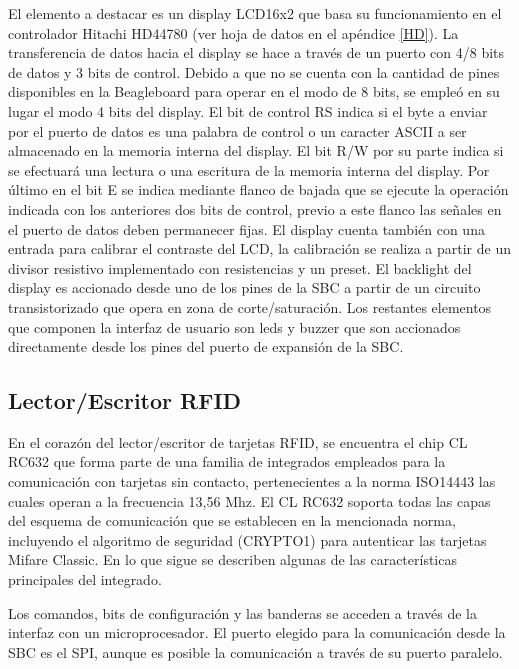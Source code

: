 \newpage
{}

El elemento a destacar es un display LCD16x2 que basa su funcionamiento en el controlador Hitachi HD44780 \cite{dpy} (ver hoja de datos en el apéndice \ref{HD}). La transferencia de datos hacia el display se hace a través de un puerto con 4/8 bits de datos y 3 bits de control. Debido a que no se cuenta con la cantidad de pines disponibles en la Beagleboard para operar en el modo de 8 bits, se empleó en su lugar el modo 4 bits del display. El bit de control RS indica si el byte a enviar por el puerto de datos es una palabra de control o un caracter ASCII a ser almacenado en la memoria interna del display. El bit R/W por su parte indica si se efectuará una lectura o una escritura de la memoria interna del display. Por último en el bit E se indica mediante flanco de bajada que se ejecute la operación indicada con los anteriores dos bits de control, previo a este flanco las señales en el puerto de datos deben permanecer fijas.
El display cuenta también con una entrada para calibrar el contraste del LCD, la calibración se realiza a partir de un divisor resistivo implementado con resistencias y un preset.
El backlight del display es accionado desde uno de los pines de la SBC a partir de un circuito transistorizado que opera en zona de corte/saturación.
Los restantes elementos que componen la interfaz de usuario son leds y buzzer que son accionados directamente desde los pines del puerto de expansión de la SBC.

\subsection{Lector/Escritor RFID}
En el corazón del lector/escritor de tarjetas RFID, se encuentra el chip CL RC632 que forma parte de una familia de integrados empleados para la comunicación con tarjetas sin contacto, pertenecientes a la norma ISO14443 las cuales operan a la frecuencia 13,56 Mhz.
El CL RC632 soporta todas las capas del esquema de comunicación que se establecen en la mencionada norma, incluyendo el algoritmo de seguridad (CRYPTO1) para autenticar las tarjetas Mifare Classic. En lo que sigue se describen algunas de las características principales del integrado.

\bigskip
{}

Los comandos, bits de configuración y las banderas se acceden a través de la interfaz con un microprocesador. El puerto elegido para la comunicación desde la SBC es el SPI, aunque es posible la comunicación a través de su puerto paralelo. 

